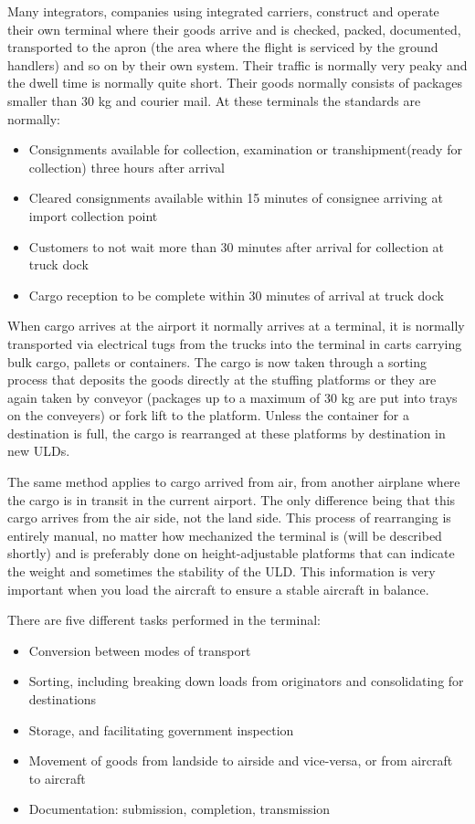 Many integrators, companies using integrated carriers, construct and operate their own terminal where their goods arrive and is checked, packed, documented, transported to the apron (the area where the flight is serviced by the ground handlers) and so on by their own system. 
Their traffic is normally very peaky and the dwell time is normally quite short. Their goods normally consists of packages smaller than 30 kg and courier mail. At these terminals the standards are normally:
\begin{itemize}
\item Consignments available for collection, examination or transhipment(ready for collection) three hours after arrival
\item Cleared consignments available within 15 minutes of consignee arriving at import collection point
\item Customers to not wait more than 30 minutes after arrival for collection at truck dock
\item Cargo reception to be complete within 30 minutes of arrival at truck dock
\end{itemize}

When cargo arrives at the airport it normally arrives at a terminal, it is normally transported via electrical tugs from the trucks into the terminal in carts carrying bulk cargo, pallets or containers. The cargo is now taken through a sorting process that deposits the goods directly at the stuffing platforms or they are again taken by conveyor (packages up to a maximum of 30 kg are put into trays on the conveyers) or fork lift to the platform.
Unless the container for a destination is full, the cargo is rearranged at these platforms by destination in new ULDs.


The same method applies to cargo arrived from air, from another airplane where the cargo is in transit in the current airport. The only difference being that this cargo arrives from the air side, not the land side.
This process of rearranging is entirely manual, no matter how mechanized the terminal is (will be described shortly) and is preferably done on height-adjustable platforms that can indicate the weight and sometimes the stability of the ULD. This information is very important when you load the aircraft to ensure a stable aircraft in balance.


There are five different tasks performed in the terminal:
\begin{itemize}
\item Conversion between modes of transport
\item Sorting, including breaking down loads from originators and consolidating for destinations
\item Storage, and facilitating government inspection
\item Movement of goods from landside to airside and vice-versa, or from aircraft to aircraft
\item Documentation: submission, completion, transmission
\end{itemize}

